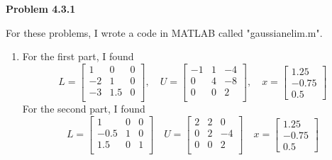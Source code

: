 \documentclass{article}
\newcommand{\Problem}[1]{\textbf{Problem #1}}
\begin{document}
\Problem{4.3.1}

For these problems, I wrote a code in MATLAB called "gaussianelim.m". 
\begin{enumerate}
\item For the first part, I found 
\begin{equation*}
L = 
\begin{bmatrix}
1 & 0 & 0\\
-2 & 1 & 0\\
-3 & 1.5 & 0\\
\end{bmatrix},
\quad
U = 
\begin{bmatrix}
-1 & 1 & -4\\
0 & 4 & -8\\
0 & 0 & 2\\	
\end{bmatrix},
\quad
x = 
\begin{bmatrix}
1.25\\
-0.75\\
0.5
\end{bmatrix}
\end{equation*}
For the second part, I found
\begin{equation*}
L = 
\begin{bmatrix}
1 & 0 & 0\\
-0.5 & 1 & 0\\ 	
1.5 & 0 & 1\\
\end{bmatrix}
\quad
U = 
\begin{bmatrix}
2 & 2 & 0\\
0 & 2 & -4\\
0 & 0 & 2\\
\end{bmatrix}
\quad
x = 
\begin{bmatrix}
1.25\\
-0.75\\
0.5
\end{bmatrix}
\end{equation*}


\end{enumerate}
\end{document}
